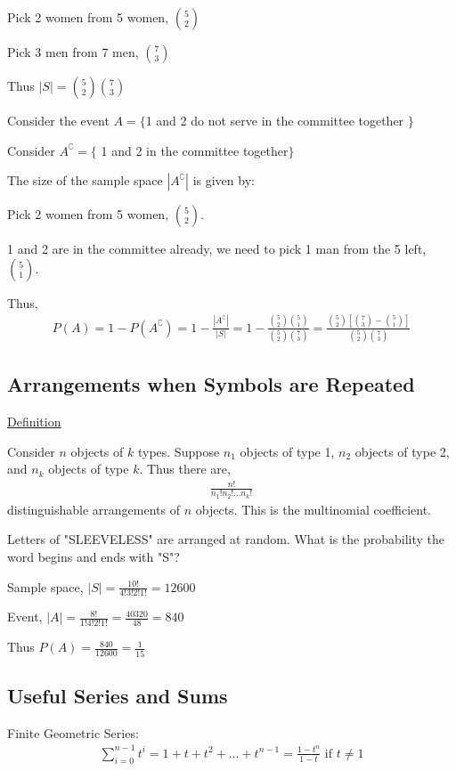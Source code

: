 \documentclass{article}
\begin{document}
Pick 2 women from 5 women, $\binom{5}{2}$

Pick 3 men from 7 men, $\binom{7}{3}$

Thus $|S| = \binom{5}{2}\binom{7}{3}$

Consider the event $A = \{$1 and 2 do not serve in the committee together $\}$

Consider $A^{\complement} = \{$ 1 and 2 in the committee together$\}$

The size of the sample space $|A^{\complement}|$ is given by:

Pick 2 women from 5 women, $\binom{5}{2}$.

1 and 2 are in the committee already, we need to pick 1 man from the 5 left, $\binom{5}{1}$. 

Thus,
\begin{align*}
    P(A) = 1 - P(A^{\complement}) = 1 - \frac{|A^{\complement}|}{|S|} = 1 - \frac{\binom{5}{2}\binom{5}{1}}{\binom{5}{2}\binom{7}{3}} = \frac{\binom{5}{2}[\binom{7}{3} - \binom{5}{1}]}{\binom{5}{2}\binom{7}{3}}
\end{align*}

\subsection{Arrangements when Symbols are Repeated}

\underline{Definition}

Consider $n$ objects of $k$ types. Suppose $n_1$ objects of type 1, $n_2$ objects of type 2, and $n_k$ objects of type $k$. Thus there are,
\begin{align*}
    \frac{n!}{n_1!n_2!\ldots n_k!}
\end{align*}
distinguishable arrangements of $n$ objects. This is the multinomial coefficient. 

Letters of "SLEEVELESS" are arranged at random. What is the probability the word begins and ends with "S"?

Sample space, $|S| = \frac{10!}{4!3!2!1!} = 12600$

Event, $|A| = \frac{8!}{1!4!2!1!} = \frac{40320}{48} = 840$

Thus $P(A) = \frac{840}{12600} = \frac{1}{15}$

\subsection{Useful Series and Sums}

Finite Geometric Series:
\begin{align*}
    \sum_{i=0}^{n-1}t^i = 1 + t + t^2 + \ldots + t^{n-1} = \frac{1-t^n}{1-t} \text{ if } t \ne 1\\
\end{align*}
\end{document}

